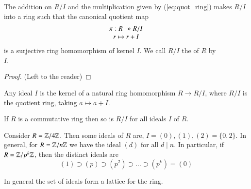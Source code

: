 \begin{thm}
    The addition on $R/I$ and the multiplication given by (\ref{eq:quot_ring}) makes $R/I$ into a ring such that the canonical quotient map \begin{equation}
        \begin{array}{c} \pi: R \twoheadrightarrow R/I \\ r\mapsto r+I \end{array}
    \end{equation}
    is a surjective ring homomorphism of kernel $I$. We call $R/I$ the  of $R$ by \\$I$.
    \begin{proof}
        (Left to the reader)
    \end{proof}
\end{thm}

\begin{thm}
        Any ideal $I$ is the kernel of a natural ring homomorphism $R \rightarrow R/I$, where $R/I$ is the quotient ring, taking $a \mapsto a+I$. 
\end{thm}

\begin{rmk}
    If $R$ is a commutative ring then so is $R/I$ for all ideals $I$ of $R$.
\end{rmk}

\begin{eg}
        Consider $R = \mathbb Z/4\mathbb Z$. Then some ideals of $R$ are, $I = (0),(1),(2) = \{0,2\}$. In general, for $R = \mathbb Z/n\mathbb Z$ we have the ideal $(d)$ for all $d \;\vert\;n$. In particular, if $R = \mathbb Z/p^k\mathbb Z$, then the distinct ideals are $$(1)\supset(p)\supset(p^2)\supset...\supset(p^k)=(0)$$
\end{eg}


\begin{rmk}
        In general the set of ideals form a lattice for the ring.
\end{rmk}


